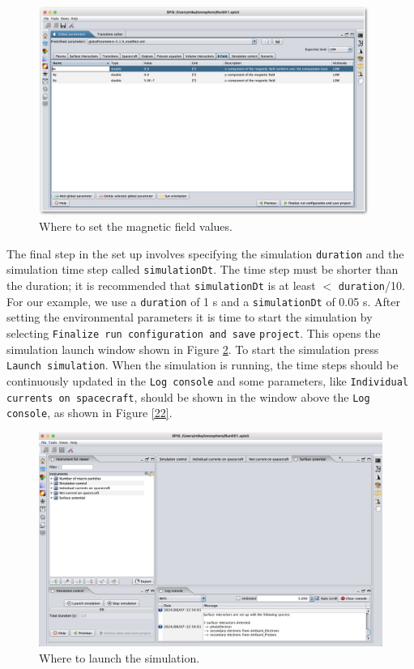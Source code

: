 \documentclass[a4paper, 12pt]{article}
\begin{document}
\begin{figure}[!ht]
    \centering
    \includegraphics[width=0.96\textwidth]{fig20.jpg}
    \caption{Where to set the magnetic field values.}
    \label{20}
\end{figure}

The final step in the set up involves specifying the simulation \verb|duration| and the simulation time step called \verb|simulationDt|. The time step must be shorter than the duration; it is recommended that \verb|simulationDt| is at least $<$ \verb|duration|/10. For our example, we use a \verb|duration| of 1 s and a \verb|simulationDt| of 0.05 s. %
After setting the environmental parameters it is time to start the simulation by selecting \verb|Finalize run configuration and save| \verb|project|. This opens the simulation  launch window shown in Figure \ref{21}. To start the simulation press \verb|Launch simulation|. When the simulation is running, the time steps should be continuously updated in the \verb|Log console| and some parameters, like \verb|Individual currents on spacecraft|, should be shown in the window above the \verb|Log| \verb|console|, as shown in Figure \ref{22}.

\begin{figure}[!ht]
    \centering
    \includegraphics[width=1\textwidth]{fig21.jpg}
    \caption{Where to launch the simulation.}
    \label{21}
\end{figure}
\end{document}
